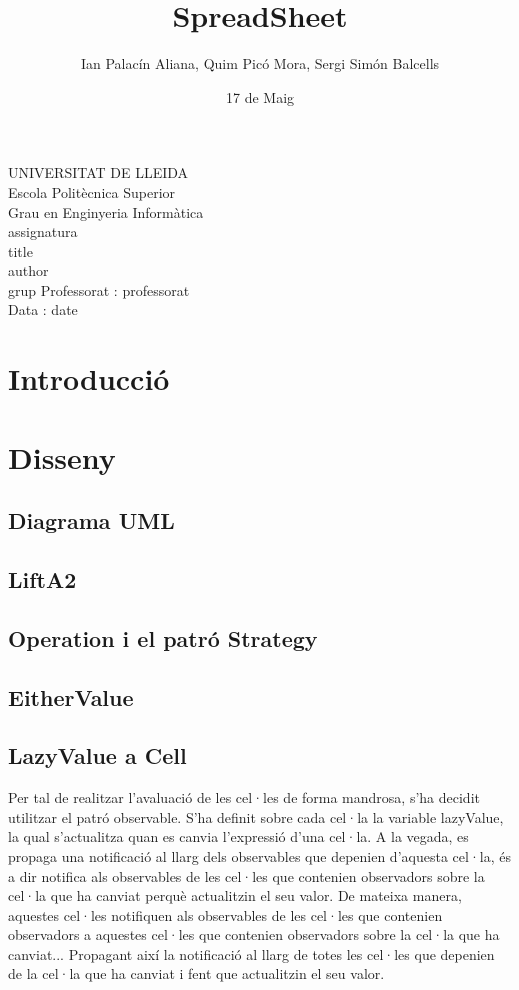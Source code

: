 \documentclass{article}
\title{SpreadSheet}
\author{Ian Palacín Aliana, Quim Picó Mora, Sergi Simón Balcells}
\date{17 de Maig}
\renewcommand{\maketitle}{ %
	\begin{titlepage}
		\raggedright{UNIVERSITAT DE LLEIDA \\
			Escola Politècnica Superior \\
			Grau en Enginyeria Informàtica\\
			\1assignatura\\}
		\vspace{5cm}
		\centering\huge{\5title \\}
		\vspace{3cm}
		\large{\6author} \\
		\normalsize{\3grup}
		\vfill
		Professorat : \4professorat \\
		Data : \7date
\end{titlepage}}
\begin{document}
	\maketitle
	\newpage
	\section{Introducció}%
	\section{Disseny}
	\subsection{Diagrama UML}%
	\subsection{LiftA2}%
	 
	\subsection{Operation i el patró Strategy}
	
	\subsection{EitherValue}%
	
	\subsection{LazyValue a Cell}%
Per tal de realitzar l'avaluació de les cel·les de forma mandrosa, s'ha decidit utilitzar el patró observable. S'ha definit sobre cada cel·la la variable lazyValue, la qual s'actualitza quan es canvia l'expressió d'una cel·la. A la vegada, es propaga una notificació al llarg dels observables que depenien d'aquesta cel·la, és a dir notifica als observables de les cel·les que contenien observadors sobre la cel·la que ha canviat perquè actualitzin el seu valor. De mateixa manera, aquestes cel·les notifiquen als observables de les cel·les que contenien observadors a aquestes cel·les que contenien observadors sobre la cel·la que ha canviat... Propagant així la notificació al llarg de totes les cel·les que depenien de la cel·la que ha canviat i fent que actualitzin el seu valor.
\end{document}
